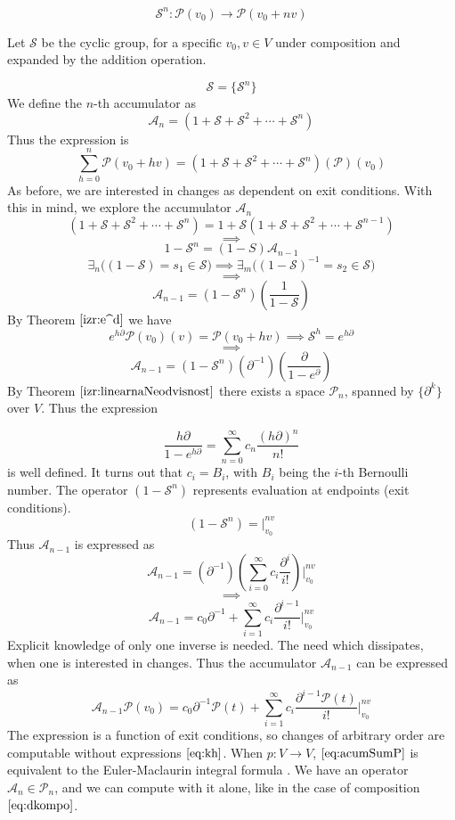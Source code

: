 \documentclass{article}
\newcommand{\Shift}{\mathcal{S}}
\newcommand{\dP}{\mathcal{P}}
\newcommand{\D}{\partial}
\begin{document}
   \begin{equation}
   \Shift^n:\dP(v_0)\to \dP(v_0+nv)
   \end{equation}
    
    Let $\Shift$ be the cyclic group, for a specific $v_0, v\in V$ under composition and expanded by the addition operation.
    
   $$\Shift=\{\Shift^n\}$$   
   We define the $n$-th accumulator as 
   $$\mathcal{A}_n=(1+\Shift+\Shift^2+\cdots+\Shift^n)$$ Thus the expression is
   $$\sum\limits_{h=0}^{n}\dP(v_0+hv)=(1+\Shift+\Shift^2+\cdots+\Shift^n)(\dP)(v_0)$$
   As before, we are interested in changes as dependent on exit conditions. With this in mind, we explore the accumulator $\mathcal{A}_n$
   $$(1+\Shift+\Shift^2+\cdots+\Shift^n)=1+\Shift(1+\Shift+\Shift^2+\cdots+\Shift^{n-1})$$
   $$\implies$$
   $$1-\Shift^n=(1-S)\mathcal{A}_{n-1}$$
   $$\exists_n\Big((1-\Shift)=s_1\in\Shift\Big)\implies \exists_m\Big((1-\Shift)^{-1}=s_2\in \Shift\Big)$$
   $$\implies$$
   $$\mathcal{A}_{n-1}=(1-\Shift^n)(\frac{1}{1-\Shift})$$
   By Theorem $\ref{izr:e^d}$ we have
   $$e^{h\D}\dP(v_0)(v)=\dP(v_0+hv)\implies \Shift^h=e^{h\D}$$
   $$\implies$$
   $$\mathcal{A}_{n-1}=(1-\Shift^n)(\D^{-1})(\frac{\D}{1-e^{\D}})$$
   By Theorem $\ref{izr:linearnaNeodvisnost}$  there exists a space $\dP_n$, spanned by $\{\D^k\}$ over $V$. Thus the expression   
     
    \begin{equation}
    	\frac{h\D}{1-e^{h\D}}=\sum\limits_{n=0}^{\infty}c_n\frac{(h\D)^n}{n!}
    \end{equation}
    is well defined. It turns out that $c_i=B_i$, with $B_i$ being the $i$-th Bernoulli number. The operator $(1-\Shift^n)$ represents evaluation at endpoints (exit conditions).
    $$(1-\Shift^n)=\Bigg\vert_{v_0}^{nv}$$
    Thus $\mathcal{A}_{n-1}$ is expressed as
    $$\mathcal{A}_{n-1}=(\D^{-1})(\sum\limits_{i=0}^{\infty}c_i\frac{\D^i}{i!})\Bigg\vert_{v_0}^{nv}$$
    $$\implies$$
    \begin{equation}\label{eq:acumSum}
    \mathcal{A}_{n-1}=c_0\D^{-1}+\sum\limits_{i=1}^{\infty}c_i\frac{\D^{i-1}}{i!}\Bigg\vert_{v_0}^{nv}
    \end{equation}
    Explicit knowledge of only one inverse is needed. The need which dissipates, when one is interested in changes. Thus the accumulator  $\mathcal{A}_{n-1}$ can be expressed as
    \begin{equation}\label{eq:acumSumP}
    	\mathcal{A}_{n-1}\dP(v_0)=c_0\D^{-1}\dP(t)+\sum\limits_{i=1}^{\infty}c_i\frac{\D^{i-1}\dP(t)}{i!}\Bigg\vert_{v_0}^{nv}
    \end{equation}
    The expression is a function of exit conditions, so changes of arbitrary order are computable without expressions $\eqref{eq:kh}$. When $p:V\to V$, $\eqref{eq:acumSumP}$ is equivalent to the Euler-Maclaurin integral formula \cite{EulerSumAbramowitzStegun}.  We have an operator $\mathcal{A}_n\in\dP_n$, and we can compute with it alone, like in the case of composition $\eqref{eq:dkompo}$.
\end{document}

